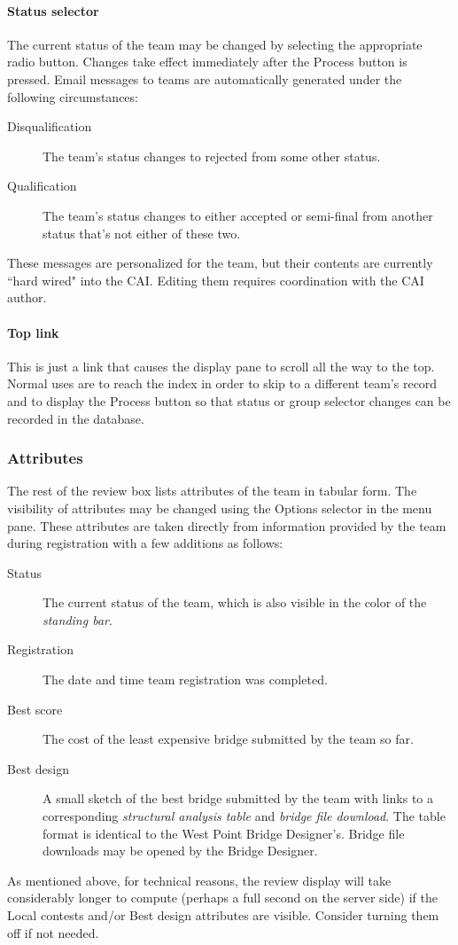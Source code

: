 \documentclass[11pt,letterpaper]{refart}
\def\ui#1{\textsf{#1}}
\begin{document}
\paragraph{Status selector}
The current status of the team may be changed by selecting the appropriate
radio button. Changes take effect immediately after the \ui{Process} button is
pressed. Email messages to teams are automatically generated under the 
following circumstances:
\begin{description}
\item[Disqualification] The team's status changes to rejected from some other status.
\item[Qualification] The team's status changes to either accepted or
semi-final from another status that's not either of these two.
\end{description}
These messages are personalized for the team, but their contents are currently
``hard wired" into the CAI. Editing them requires coordination with the CAI 
author.

\paragraph{Top link}
This is just a link that causes the display pane to scroll all the way to the top.
Normal uses are to reach the index in order to skip to a different team's record
and to display the \ui{Process} button so that status or group selector changes
can be recorded in the database.

\subsubsection{Attributes}
The rest of the review box lists attributes of the team in tabular form. The visibility of attributes
may be changed using the \ui{Options} selector in the menu pane. These attributes
are taken directly from information provided by the team during registration with a 
few additions as follows:
\begin{description}
\item[Status] The current status of the team, which is also visible in the 
color of the \emph{standing bar}.
\item[Registration] The date and time team registration was completed.
\item[Best score] The cost of the least expensive bridge submitted by the team so far.
\item[Best design] A small sketch of the best bridge submitted by the team with links
to a corresponding \emph{structural analysis table} and \emph{bridge file download}.
The table format is identical to the West Point Bridge Designer's. Bridge file downloads 
may be opened by the Bridge Designer.
\end{description}
As mentioned above, for technical reasons, the review display will take considerably 
longer to compute (perhaps a full second on the server side) if the \ui{Local contests}  
and/or  \ui{Best design} attributes are visible. Consider turning them off if not needed.
\end{document}
